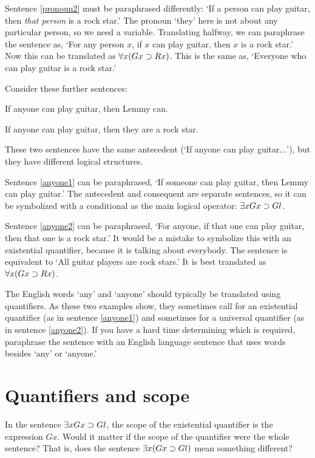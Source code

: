Sentence \ref{pronoun2} must be paraphrased differently: `If a person can play guitar, then \emph{that person} is a rock star.' The pronoun `they' here is not about any particular person, so we need a variable. Translating halfway, we can paraphrase the sentence as, `For any person $x$, if $x$ can play guitar, then $x$ is a rock star.' Now this can be translated as $\forall x (Gx \supset Rx)$. This is the same as, `Everyone who can play guitar is a rock star.'


Consider these further sentences:

\begin{earg}
\item[\ex{anyone1}] If anyone can play guitar, then Lemmy can.
\item[\ex{anyone2}] If anyone can play guitar, then they are a rock star.
\end{earg}

These two sentences have the same antecedent (`If anyone can play guitar$\ldots$'), but they have different logical structures.

Sentence \ref{anyone1} can be paraphrased, `If someone can play guitar, then Lemmy can play guitar.' The antecedent and consequent are separate sentences, so it can be symbolized with a conditional as the main logical operator: $\exists x Gx \supset Gl$.

Sentence \ref{anyone2} can be paraphrased, `For anyone, if that one can play guitar, then that one is a rock star.' It would be a mistake to symbolize this with an existential quantifier, because it is talking about everybody. The sentence is equivalent to `All guitar players are rock stars.' It is best translated as $\forall x(Gx \supset Rx)$.

The English words `any' and `anyone' should typically be translated using quantifiers. As these two examples show, they sometimes call for an existential quantifier (as in sentence \ref{anyone1}) and sometimes for a universal quantifier (as in sentence \ref{anyone2}). If you have a hard time determining which is required, paraphrase the sentence with an English language sentence that uses words besides `any' or `anyone.'


\section{Quantifiers and scope}

In the sentence $\exists x Gx \supset Gl$, the scope of the existential quantifier is the expression $Gx$. Would it matter if the scope of the quantifier were the whole sentence? That is, does the sentence $\exists x (Gx \supset Gl)$ mean something different?

